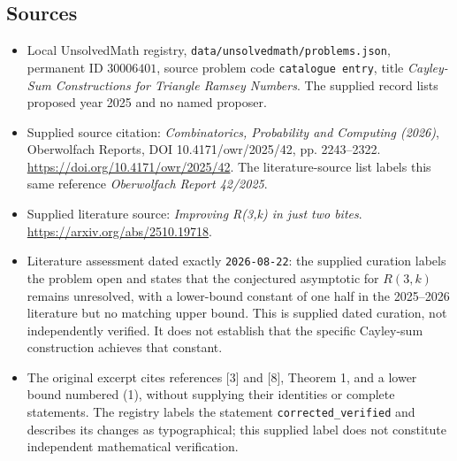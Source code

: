 \documentclass[11pt]{article}
\begin{document}
\subsection{Sources}
\begin{itemize}
\item Local UnsolvedMath registry, \texttt{data/unsolvedmath/problems.json}, permanent ID \(30006401\), source problem code \texttt{catalogue entry}, title \emph{Cayley-Sum Constructions for Triangle Ramsey Numbers}. The supplied record lists proposed year 2025 and no named proposer.
\item Supplied source citation: \emph{Combinatorics, Probability and Computing (2026)}, Oberwolfach Reports, DOI 10.4171/owr/2025/42, pp. 2243--2322. \url{https://doi.org/10.4171/owr/2025/42}. The literature-source list labels this same reference \emph{Oberwolfach Report 42/2025}.
\item Supplied literature source: \emph{Improving R(3,k) in just two bites}. \url{https://arxiv.org/abs/2510.19718}.
\item Literature assessment dated exactly \texttt{2026-08-22}: the supplied curation labels the problem open and states that the conjectured asymptotic for \(R(3,k)\) remains unresolved, with a lower-bound constant of one half in the 2025--2026 literature but no matching upper bound. This is supplied dated curation, not independently verified. It does not establish that the specific Cayley-sum construction achieves that constant.
\item The original excerpt cites references [3] and [8], Theorem 1, and a lower bound numbered (1), without supplying their identities or complete statements. The registry labels the statement \texttt{corrected\_verified} and describes its changes as typographical; this supplied label does not constitute independent mathematical verification.
\end{itemize}
\end{document}
